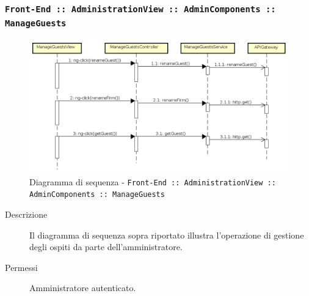 \documentclass[../DefinizioneDiProdotto_v3.0.0.tex]{subfiles}
\begin{document}
\subsubsection{\texttt{Front-End :: AdministrationView :: AdminComponents :: ManageGuests}}
\begin{figure}[!h]
	\centering
	\includegraphics[width=\textwidth]{DiagrammiSequenza/Front-End/AdministrationView/ManageGuests.png}
	\caption{Diagramma di sequenza - \texttt{Front-End :: AdministrationView :: AdminComponents :: ManageGuests }}
\end{figure}
\begin{description}
	\item [Descrizione] Il diagramma di sequenza sopra riportato illustra l'operazione di gestione degli ospiti da parte dell'amministratore.
	\item [Permessi] Amministratore autenticato.
\end{description}

\newpage
\end{document}
